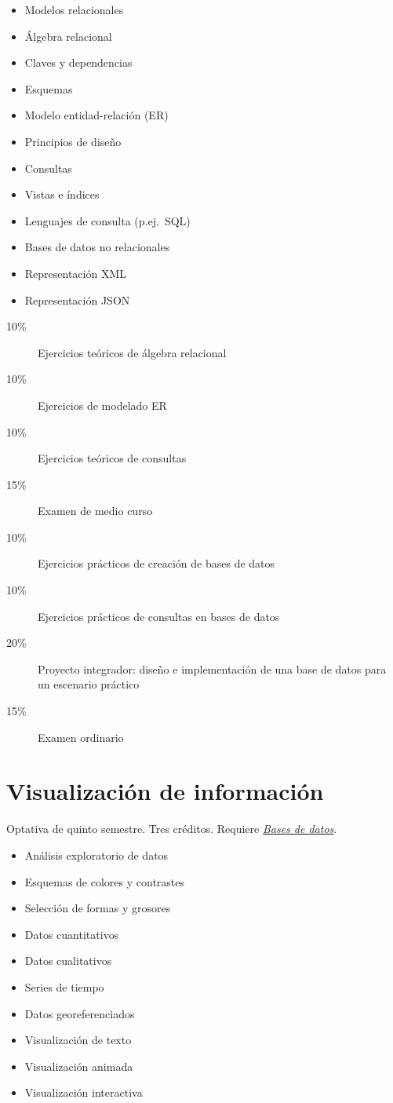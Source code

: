 \documentclass{article}
\begin{document}
\begin{multicols}{4}
\begin{itemize}
\item{Modelos relacionales}
\item{\'{A}lgebra relacional}
\item{Claves y dependencias}
\item{Esquemas}
\item{Modelo entidad-relaci\'{o}n (ER)}
\item{Principios de dise\~{n}o}
\item{Consultas}
\item{Vistas e \'{i}ndices}
\item{Lenguajes de consulta (p.ej.\ SQL)}
\item{Bases de datos no relacionales}
\item{Representaci\'{o}n XML}
\item{Representaci\'{o}n JSON}  
\end{itemize}

\begin{description}
\item[10\%]{Ejercicios te\'{o}ricos de \'{a}lgebra relacional}
\item[10\%]{Ejercicios de modelado ER}
\item[10\%]{Ejercicios te\'{o}ricos de consultas}  
\item[15\%]{Examen de medio curso}
\item[10\%]{Ejercicios pr\'{a}cticos de creaci\'{o}n de bases de datos}
\item[10\%]{Ejercicios pr\'{a}cticos de consultas en bases de datos}
\item[20\%]{Proyecto integrador: dise\~{n}o e implementaci\'{o}n de
  una base de datos para un escenario pr\'{a}ctico}
\item[15\%]{Examen ordinario}
\end{description}  

\vfill\null \columnbreak

\hypertarget{vdi}{\section*{Visualizaci\'{o}n de informaci\'{o}n}}

Optativa de quinto semestre. Tres cr\'{e}ditos. Requiere
\hyperlink{bdd}{\em Bases de datos}.

\begin{itemize}
\item{An\'{a}lisis exploratorio de datos}
\item{Esquemas de colores y contrastes}
\item{Selecci\'{o}n de formas y grosores}
\item{Datos cuantitativos}
\item{Datos cualitativos}
\item{Series de tiempo}
\item{Datos georeferenciados}
\item{Visualizaci\'{o}n de texto}
\item{Visualizaci\'{o}n animada}  
\item{Visualizaci\'{o}n interactiva}
\end{itemize}


\end{multicols}
\end{document}
